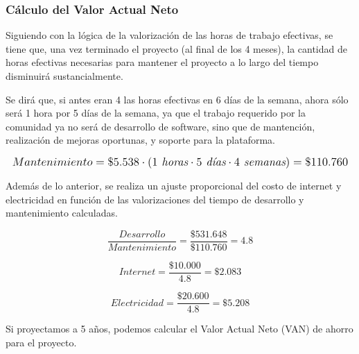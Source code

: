 \subsubsection{Cálculo del Valor Actual Neto}
Siguiendo con la lógica de la valorización de las horas de trabajo efectivas, se tiene que, una vez terminado el proyecto (al final de los 4 meses), la cantidad de horas efectivas necesarias para mantener el proyecto a lo largo del tiempo disminuirá sustancialmente.

Se dirá que, si antes eran 4 las horas efectivas en 6 días de la semana, ahora sólo será 1 hora por 5 días de la semana, ya que el trabajo requerido por la comunidad ya no será de desarrollo de software, sino que de mantención, realización de mejoras oportunas, y soporte para la plataforma.

\[
\mathlarger{
	Mantenimiento = \$5.538 \cdot \left(1 \textit{ horas}\cdot5 \textit{ días}\cdot4 \textit{ semanas}\right) = \$110.760
}
\]

Además de lo anterior, se realiza un ajuste proporcional del costo de internet y electricidad en función de las valorizaciones del tiempo de desarrollo y mantenimiento calculadas.

\[
\frac{Desarrollo}{Mantenimiento} = \frac{\$531.648}{\$110.760} = 4.8
\]

\[
Internet = \frac{\$10.000}{4.8} = \$2.083
\]

\[
Electricidad = \frac{\$20.600}{4.8} = \$5.208
\]

Si proyectamos a 5 años, podemos calcular el Valor Actual Neto (VAN) de ahorro para el proyecto.


